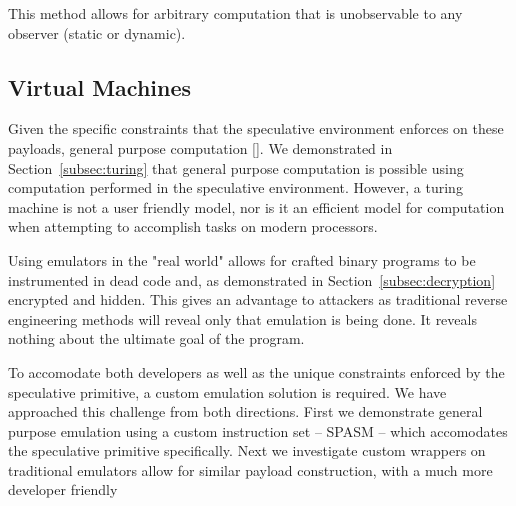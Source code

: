 This method allows for arbitrary computation that is unobservable to any observer (static or dynamic). 


% 
% 

\subsection{Virtual Machines}
Given the specific constraints that the speculative environment enforces on
these payloads, general purpose computation []. We demonstrated in
Section~\ref{subsec:turing} that general purpose computation is possible using
computation performed in the speculative environment. However, a turing machine
is not a user friendly model, nor is it an efficient model for computation when
attempting to accomplish tasks on modern processors. 

Using emulators in the "real world" allows for crafted binary programs to be
instrumented in dead code and, as demonstrated in
Section~\ref{subsec:decryption} encrypted and hidden. This gives an advantage to
attackers as traditional reverse engineering methods will reveal only that
emulation is being done. It reveals nothing about the ultimate goal of the
program. 

To accomodate both developers as well as the unique constraints 
enforced by the speculative primitive, a custom emulation solution is required. We 
have approached this challenge from both directions. First we demonstrate 
general purpose emulation using a custom instruction set -- SPASM -- which
accomodates the speculative primitive specifically. Next we investigate custom 
wrappers on traditional emulators allow for similar payload construction,
with a much more developer friendly 

%   

